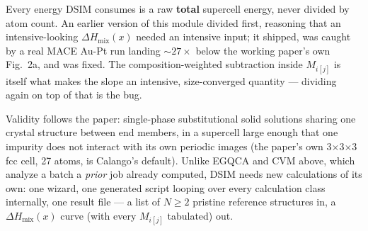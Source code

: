 \begin{calnote}
Every energy DSIM consumes is a raw \textbf{total} supercell energy, never
divided by atom count. An earlier version of this module divided first,
reasoning that an intensive-looking $\Delta H_\text{mix}(x)$ needed an
intensive input; it shipped, was caught by a real MACE Au-Pt run landing
$\sim 27\times$ below the working paper's own Fig.~2a, and was fixed. The
composition-weighted subtraction inside $M_{i[j]}$ is itself what makes the
slope an intensive, size-converged quantity --- dividing again on top of
that is the bug.
\end{calnote}

Validity follows the paper: single-phase substitutional solid solutions
sharing one crystal structure between end members, in a supercell large
enough that one impurity does not interact with its own periodic images
(the paper's own 3$\times$3$\times$3 fcc cell, 27 atoms, is Calango's
default). Unlike EGQCA and CVM above, which analyze a batch a \emph{prior}
job already computed, DSIM needs new calculations of its own: one wizard,
one generated script looping over every calculation class internally, one
result file --- a list of $N \geq 2$ pristine reference structures in, a
$\Delta H_\text{mix}(x)$ curve (with every $M_{i[j]}$ tabulated) out.
